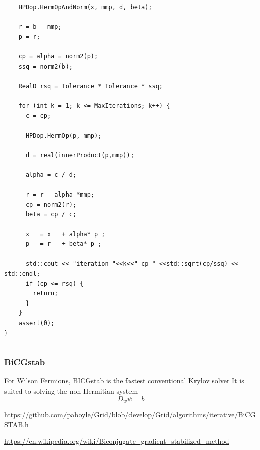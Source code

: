 \documentclass[pdf,ps,8pt]{beamer}
\newcommand{\link}[1]{\href{#1}{ {\color{blue} #1} }}
\begin{document}
\begin{frame}[fragile]
\begin{columns}
\begin{column}{0.5\textwidth}
{\begin{verbatim}
    HPDop.HermOpAndNorm(x, mmp, d, beta);
    
    r = b - mmp;
    p = r;

    cp = alpha = norm2(p);
    ssq = norm2(b);

    RealD rsq = Tolerance * Tolerance * ssq;

    for (int k = 1; k <= MaxIterations; k++) {
      c = cp;

      HPDop.HermOp(p, mmp);

      d = real(innerProduct(p,mmp));

      alpha = c / d;

      r = r - alpha *mmp;
      cp = norm2(r);
      beta = cp / c;

      x   = x   + alpha* p ;
      p   = r   + beta* p ;

      std::cout << "iteration "<<k<<" cp " <<std::sqrt(cp/ssq) << std::endl;
      if (cp <= rsq) {
        return;
      }
    }
    assert(0);
}
  \end{verbatim}
          }
      \end{column}
      \end{columns}

  \end{frame}

  \begin{frame}[fragile]\small\frametitle{ BiCGstab }
    For Wilson Fermions, BICGstab is the fastest conventional Krylov solver
    It is suited to solving the non-Hermitian system $$ D_w \psi = b$$

    \link{https://github.com/paboyle/Grid/blob/develop/Grid/algorithms/iterative/BiCGSTAB.h}

    \href{https://en.wikipedia.org/wiki/Biconjugate_gradient_stabilized_method}
    {{\color{blue} https://en.wikipedia.org/wiki/Biconjugate\_gradient\_stabilized\_method}}
    
  \end{frame}
\end{document}
